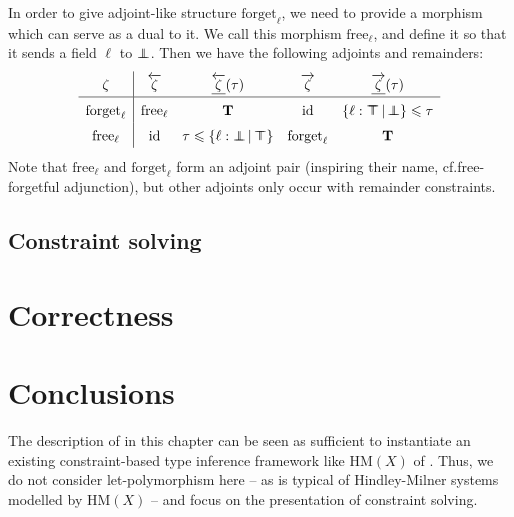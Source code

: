 \begin{example}
    In order to give adjoint-like structure $\mathrm{forget}_\ell$, we need to provide a morphism which can serve as a dual to it. We call this morphism $\mathrm{free}_\ell$, and define it so that it sends a field $\ell$ to $\bot \!\!\!\! \bot$. Then we have the following adjoints and remainders:
    $$\renewcommand\arraystretch{1.5}
    \begin{array}{c|cccc}
    \morph & \ladj \morph & \ladjrest \morph(\tau) & \radj \morph & \radjrest \morph(\tau) \\ \hline 
    \mathrm{forget}_\ell & \mathrm{free}_\ell & \tru & \mathrm{id} & \flext{\ell : \flftop}{\flfbot} \sub \tau \\
    \mathrm{free}_\ell & \mathrm{id} & \tau \sub \flext{\ell : \flfbot}{\flftop} & \mathrm{forget}_\ell & \tru
    \end{array}$$
    Note that $\mathrm{free}_\ell$ and $\mathrm{forget}_\ell$ form an adjoint pair (inspiring their name, cf.\@ free-forgetful adjunction), but other adjoints only occur with remainder constraints.
\end{example}

\subsection{Constraint solving}



\section{Correctness}
\label{sec:correctness}

\section{Conclusions}
\label{sec:conclusions}

The description of \inference{} in this chapter can be seen as sufficient to instantiate an existing constraint-based type inference framework like $\mathrm{HM}(X)$ of \textcite{constraint-based-hm}. Thus, we do not consider let-polymorphism here -- as is typical of Hindley-Milner systems modelled by $\mathrm{HM}(X)$ -- and focus on the presentation of constraint solving.


